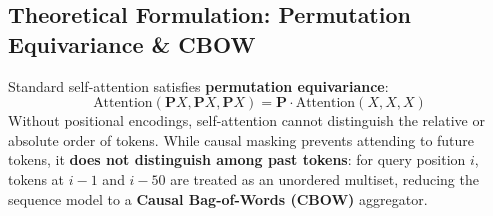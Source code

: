 \documentclass[11pt,a4paper]{article}
\begin{document}
\subsection{Theoretical Formulation: Permutation Equivariance \& CBOW}
Standard self-attention satisfies \textbf{permutation equivariance}:
\begin{equation}
    \text{Attention}(\mathbf{P}X, \mathbf{P}X, \mathbf{P}X) = \mathbf{P} \cdot \text{Attention}(X, X, X)
\end{equation}
Without positional encodings, self-attention cannot distinguish the relative or absolute order of tokens. While causal masking prevents attending to future tokens, it \textbf{does not distinguish among past tokens}: for query position $i$, tokens at $i-1$ and $i-50$ are treated as an unordered multiset, reducing the sequence model to a \textbf{Causal Bag-of-Words (CBOW)} aggregator.
\end{document}
